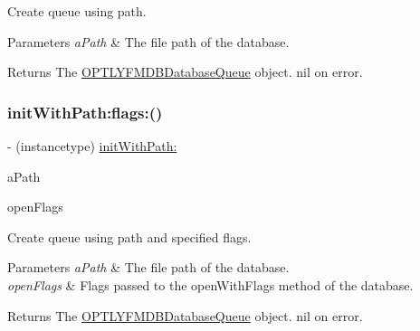 Create queue using path.


\begin{DoxyParams}{Parameters}
{\em a\+Path} & The file path of the database.\\
\hline
\end{DoxyParams}
\begin{DoxyReturn}{Returns}
The {\ttfamily \mbox{\hyperlink{interface_o_p_t_l_y_f_m_d_b_database_queue}{O\+P\+T\+L\+Y\+F\+M\+D\+B\+Database\+Queue}}} object. {\ttfamily nil} on error. 
\end{DoxyReturn}
\mbox{\label{interface_o_p_t_l_y_f_m_d_b_database_queue_ab6767258c1a06d640d46994382479be4}} 
\subsubsection{\texorpdfstring{init\+With\+Path\+:flags\+:()}{initWithPath:flags:()}}
{\footnotesize\ttfamily -\/ (instancetype) \mbox{\hyperlink{interface_o_p_t_l_y_f_m_d_b_database_queue_affaf3bb46813b9631b2dc4c8e0703e3a}{init\+With\+Path\+:}} \begin{DoxyParamCaption}\item[{(N\+S\+String $\ast$\+\_\+\+Nullable)}]{a\+Path }\item[{flags:(int)}]{open\+Flags }\end{DoxyParamCaption}}

Create queue using path and specified flags.


\begin{DoxyParams}{Parameters}
{\em a\+Path} & The file path of the database. \\
\hline
{\em open\+Flags} & Flags passed to the open\+With\+Flags method of the database.\\
\hline
\end{DoxyParams}
\begin{DoxyReturn}{Returns}
The {\ttfamily \mbox{\hyperlink{interface_o_p_t_l_y_f_m_d_b_database_queue}{O\+P\+T\+L\+Y\+F\+M\+D\+B\+Database\+Queue}}} object. {\ttfamily nil} on error. 
\end{DoxyReturn}
\mbox{\label{interface_o_p_t_l_y_f_m_d_b_database_queue_a208f0214f8b43cb1b41d5ecfe481d6ae}} 
